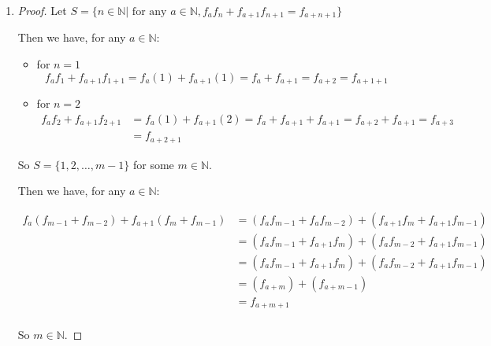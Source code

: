 \documentclass[12pt,letterpaper]{article}
\newcommand*\PCI{%
  Principle of Complete Induction%
}
\begin{document}
\begin{enumerate}
\begin{enumerate}
\begin{enumerate}
\begin{proof}
                So $m \in S$.

                Then by the \PCI, $S = \mathbb{N}$.
              \end{proof}
            \item
              \begin{proof}
                Let $S = \{n \in \mathbb{N} | \text{ for any } a \in \mathbb{N}, f_af_n + f_{a + 1}f_{n + 1} = f_{a + n + 1}\}$

                Then we have, for any $a \in \mathbb{N}$:
                \begin{itemize}
                  \item for $n = 1$
                    \[f_af_1 + f_{a + 1}f_{1 + 1} = f_a(1) + f_{a + 1}(1) = f_a + f_{a + 1} = f_{a + 2} = f_{a + 1 + 1}\]
                  \item for $n = 2$
                    \begin{align*}
                      f_af_2 + f_{a + 1}f_{2 + 1} &= f_a(1) + f_{a + 1}(2) = f_a + f_{a + 1} + f_{a + 1} = f_{a + 2} + f_{a + 1} = f_{a + 3} \\
                      &= f_{a + 2 + 1}
                    \end{align*}
                \end{itemize}

                So $S = \{1, 2, \dots, m - 1\}$ for some $m \in \mathbb{N}$.

                Then we have, for any $a \in \mathbb{N}$:

                \begin{align*}
                  f_a\left(f_{m - 1} + f_{m - 2}\right) + f_{a + 1}\left(f_m + f_{m - 1}\right)
                  &= \left(f_af_{m - 1} + f_af_{m - 2}\right) + \left(f_{a + 1}f_m + f_{a + 1}f_{m - 1}\right) \\
                  &= \left(f_af_{m - 1} + f_{a + 1}f_m\right) + \left(f_af_{m - 2} + f_{a + 1}f_{m - 1}\right) \\
                  &= \left(f_af_{m - 1} + f_{a + 1}f_m\right) + \left(f_af_{m - 2} + f_{a + 1}f_{m - 1}\right) \\
                  &= \left(f_{a + m}\right) + \left(f_{a + m - 1}\right) \\
                  &= f_{a + m + 1} \\
                \end{align*}

                So $m \in \mathbb{N}$.


\end{proof}
\end{enumerate}
\end{enumerate}
\end{enumerate}
\end{document}
